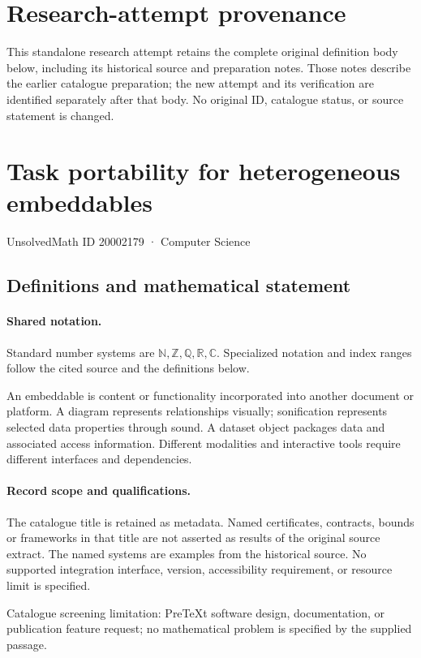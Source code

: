 \documentclass[11pt]{article}
\begin{document}
\section*{Research-attempt provenance}
This standalone research attempt retains the complete original definition body below,
including its historical source and preparation notes. Those notes describe the
earlier catalogue preparation; the new attempt and its verification are identified
separately after that body. No original ID, catalogue status, or source statement is changed.

\section{Task portability for heterogeneous embeddables}\label{20002179}
{\small UnsolvedMath ID 20002179 · Computer Science}
\subsection{Definitions and mathematical statement}

\paragraph{Shared notation.}Standard number systems are $\mathbb N,\mathbb Z,\mathbb Q,\mathbb R,\mathbb C$. Specialized notation and index ranges follow the cited source and the definitions below.


An embeddable is content or functionality incorporated into another document or platform. A diagram represents relationships visually; sonification represents selected data properties through sound. A dataset object packages data and associated access information. Different modalities and interactive tools require different interfaces and dependencies.
\paragraph{Record scope and qualifications.}
The catalogue title is retained as metadata. Named certificates, contracts, bounds or frameworks in that title are not asserted as results of the original source extract.
The named systems are examples from the historical source. No supported integration interface, version, accessibility requirement, or resource limit is specified.

Catalogue screening limitation: PreTeXt software design, documentation, or publication feature request; no mathematical problem is specified by the supplied passage.
\end{document}
